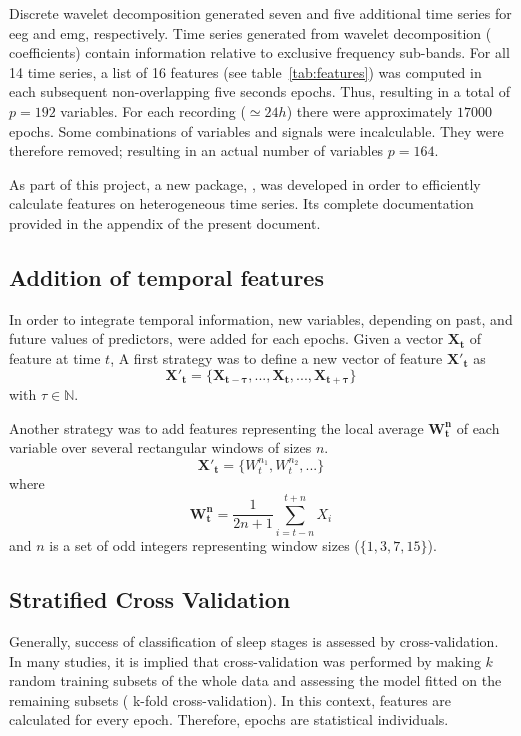 Discrete wavelet decomposition generated seven and five additional time series for \gls{eeg} and \gls{emg}, respectively.
Time series generated from wavelet decomposition (\ie{} coefficients) contain information relative to exclusive frequency sub-bands.
For all 14 time series, a list of 16 features (see table~\ref{tab:features}) was computed in each subsequent non-overlapping five seconds epochs.
Thus, resulting in a total of $p=192$ variables. For each recording ($\simeq 24h$) there were approximately $17000$ epochs.
Some combinations of variables and signals were incalculable.
They were therefore removed; resulting in an actual number of variables $p=164$.



As part of this project, a new \py{} package, \pr{}, was developed in order to efficiently
calculate features on heterogeneous time series.
Its complete documentation provided in the appendix of the present document.

\subsection{Addition of temporal features}
In order to integrate temporal information, new variables, depending on past, and future values of predictors, were added for each epochs.
Given a vector $\mathbf{X_t}$ of feature at time $t$,
A first strategy was to define a new vector of feature $\mathbf{{X'}_t}$ as
\begin{equation}
\mathbf{{X'}_t} = \{\mathbf{X_{t-\tau}}, ..., \mathbf{X_t}, ..., \mathbf{X_{t+\tau}}\}
\label{eq:tau}
\end{equation}
with $\tau \in \mathbb{N}$.

Another strategy was to add features representing the local average $\mathbf{W^n_t}$ of each variable over several rectangular windows of sizes $n$.
\begin{equation}
\mathbf{{X'}_t} = \{W^{n_1}_t, W^{n_2}_t, ...\}
\label{eq:window}
\end{equation}
where
\[
\mathbf{W^n_t} = \frac{1}{2n+1} \sum_{i = t-n}^{t+n}{X_i}
\]
and $n$ is a set of odd integers representing window sizes (\eg $\{1,3,7,15\}$).



\subsection{Stratified Cross Validation}
Generally, success of classification of sleep stages is assessed by cross-validation.
In many studies\citationneeded{}, it is implied that cross-validation was performed by making $k$ random training subsets
of the whole data and assessing the model fitted on the remaining subsets (\ie{} k-fold cross-validation). 
In this context, features are calculated for every epoch. 
Therefore, epochs are statistical individuals.

